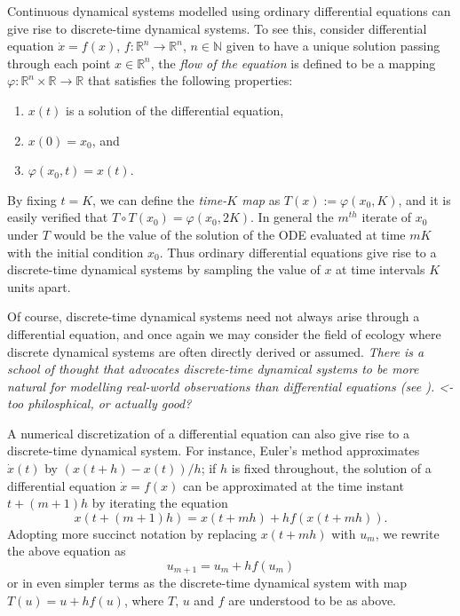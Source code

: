 \documentclass[12 pt]{article}
\begin{document}
Continuous dynamical systems modelled using ordinary differential equations can give rise to discrete-time dynamical systems. To see this, consider differential equation $\dot{x} = f(x)$, $f: \mathbb{R}^n \to \mathbb{R}^n$, $n\in\mathbb{N}$ given to have a unique solution passing through 
each point $x\in\mathbb{R}^{n}$, the \emph{flow of the equation} is defined to be a mapping $\varphi: \mathbb{R}^n \times \mathbb{R} \to \mathbb{R}$ that satisfies the following properties:
\vspace{-8mm}
\begin{enumerate}[noitemsep, label=\roman*.]
  \item $x(t)$ is a solution of the differential equation,
  \item $x(0)=x_0$, and
  \item $\varphi(x_0,t) = x(t)$.
\end{enumerate}
By fixing $t=K$, we can define the \emph{time-$K$ map} as  $T(x):= \varphi(x_0,K)$, and it is easily verified that $T\circ T(x_0) = \varphi(x_0,2K)$. In general the $m^{th}$ iterate of $x_0$ under $T$ would be the value of the solution of the ODE evaluated at time $mK$ with the initial condition $x_0$. 
Thus ordinary differential equations give rise to a discrete-time dynamical systems by sampling the value of $x$ at time intervals $K$ units apart. 

Of course, discrete-time dynamical systems need not always arise through a differential equation, and once again we may consider the field of ecology where discrete dynamical systems are often directly derived or assumed. 
\emph{There is a school of thought that advocates discrete-time dynamical systems to be more natural for modelling real-world observations than differential equations (see \cite{saber2010introduction}).  <- too philosphical, or actually good?}

A numerical discretization of a differential equation can also give rise to a discrete-time dynamical system. For instance, Euler's method approximates $\dot{x}(t)$ by $(x(t+h)-x(t))/h$; if $h$ is fixed throughout, the solution of a differential equation $\dot{x}=f(x)$ 
can be approximated at the time instant $t+(m+1)h$ by iterating the equation 
$$x(t+(m+1)h) = x(t+mh) + h f(x(t+mh)).$$ 
Adopting more succinct notation by replacing $x(t+mh)$ with $u_m$, we rewrite the above equation as
$$u_{m+1} = u_m + hf(u_m)$$
or in even simpler terms as the discrete-time dynamical system with map $T(u) = u + hf(u)$, where $T$, $u$ and $f$ are understood to be as above.
\end{document}
